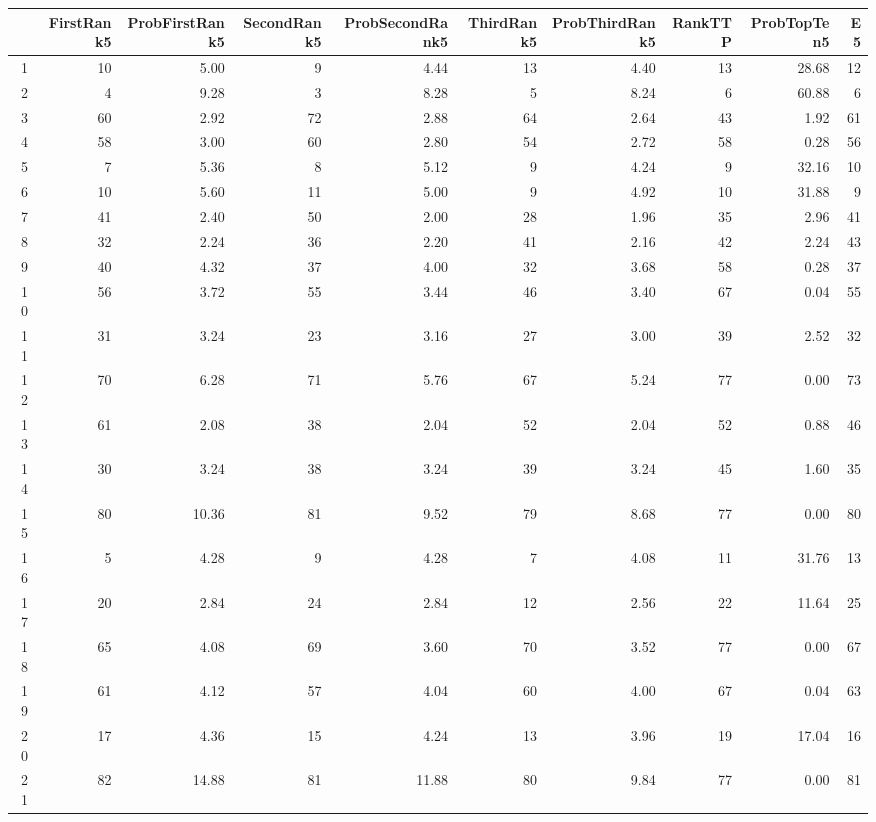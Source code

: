 \begin{table}[ht]
\centering
\begin{tabular}{rrrrrrrrrr}
  \hline
 & FirstRank5 & ProbFirstRank5 & SecondRank5 & ProbSecondRank5 & ThirdRank5 & ProbThirdRank5 & RankTTP & ProbTopTen5 & E5 \\ 
  \hline
1 &  10 & 5.00 &   9 & 4.44 &  13 & 4.40 &  13 & 28.68 &  12 \\ 
  2 &   4 & 9.28 &   3 & 8.28 &   5 & 8.24 &   6 & 60.88 &   6 \\ 
  3 &  60 & 2.92 &  72 & 2.88 &  64 & 2.64 &  43 & 1.92 &  61 \\ 
  4 &  58 & 3.00 &  60 & 2.80 &  54 & 2.72 &  58 & 0.28 &  56 \\ 
  5 &   7 & 5.36 &   8 & 5.12 &   9 & 4.24 &   9 & 32.16 &  10 \\ 
  6 &  10 & 5.60 &  11 & 5.00 &   9 & 4.92 &  10 & 31.88 &   9 \\ 
  7 &  41 & 2.40 &  50 & 2.00 &  28 & 1.96 &  35 & 2.96 &  41 \\ 
  8 &  32 & 2.24 &  36 & 2.20 &  41 & 2.16 &  42 & 2.24 &  43 \\ 
  9 &  40 & 4.32 &  37 & 4.00 &  32 & 3.68 &  58 & 0.28 &  37 \\ 
  10 &  56 & 3.72 &  55 & 3.44 &  46 & 3.40 &  67 & 0.04 &  55 \\ 
  11 &  31 & 3.24 &  23 & 3.16 &  27 & 3.00 &  39 & 2.52 &  32 \\ 
  12 &  70 & 6.28 &  71 & 5.76 &  67 & 5.24 &  77 & 0.00 &  73 \\ 
  13 &  61 & 2.08 &  38 & 2.04 &  52 & 2.04 &  52 & 0.88 &  46 \\ 
  14 &  30 & 3.24 &  38 & 3.24 &  39 & 3.24 &  45 & 1.60 &  35 \\ 
  15 &  80 & 10.36 &  81 & 9.52 &  79 & 8.68 &  77 & 0.00 &  80 \\ 
  16 &   5 & 4.28 &   9 & 4.28 &   7 & 4.08 &  11 & 31.76 &  13 \\ 
  17 &  20 & 2.84 &  24 & 2.84 &  12 & 2.56 &  22 & 11.64 &  25 \\ 
  18 &  65 & 4.08 &  69 & 3.60 &  70 & 3.52 &  77 & 0.00 &  67 \\ 
  19 &  61 & 4.12 &  57 & 4.04 &  60 & 4.00 &  67 & 0.04 &  63 \\ 
  20 &  17 & 4.36 &  15 & 4.24 &  13 & 3.96 &  19 & 17.04 &  16 \\ 
  21 &  82 & 14.88 &  81 & 11.88 &  80 & 9.84 &  77 & 0.00 &  81 \\ 

\end{tabular}
\end{table}
